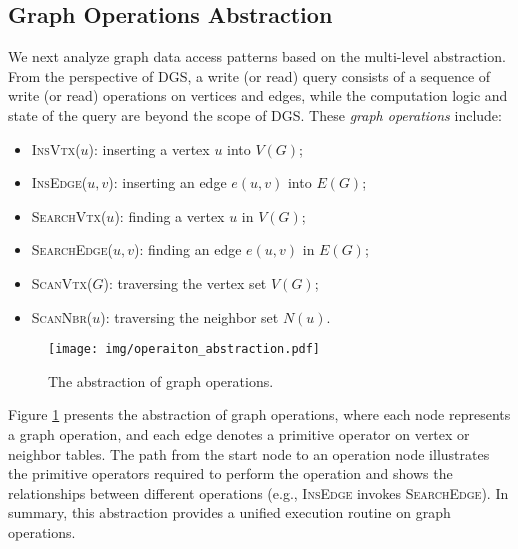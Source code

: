 \subsection{Graph Operations Abstraction}\label{sec:operation_abstraction}

We next analyze graph data access patterns based on the multi-level abstraction. From the perspective of DGS, a write (or read) query consists of a sequence of write (or read) operations on vertices and edges, while the computation logic and state of the query are beyond the scope of DGS. These \emph{graph operations} include:

\begin{itemize}[leftmargin=*]
\item \textsc{InsVtx($u$)}: inserting a vertex $u$ into $V(G)$;
\item \textsc{InsEdge($u, v$)}: inserting an edge $e(u, v)$ into $E(G)$;
\item \textsc{SearchVtx($u$)}: finding a vertex $u$ in $V(G)$;
\item \textsc{SearchEdge($u, v$)}: finding an edge $e(u, v)$ in $E(G)$;
\item \textsc{ScanVtx($G$)}: traversing the vertex set $V(G)$;
\item \textsc{ScanNbr($u$)}: traversing the neighbor set $N(u)$.
\end{itemize}

\begin{figure}[htbp]\small
    \setlength{\abovecaptionskip}{0pt}
    \setlength{\belowcaptionskip}{0pt}
    \texttt{[image: img/operaiton\_abstraction.pdf]}
    \centering
    \caption{The abstraction of graph operations.}
    \label{fig:primitive_opeartions}
\end{figure}

Figure \ref{fig:primitive_opeartions} presents the abstraction of graph operations, where each node represents a graph operation, and each edge denotes a primitive operator on vertex or neighbor tables. The path from the start node to an operation node illustrates the primitive operators required to perform the operation and shows the relationships between different operations (e.g., \textsc{InsEdge} invokes \textsc{SearchEdge}). In summary, this abstraction provides a unified execution routine on graph operations.


